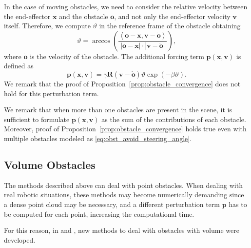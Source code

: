 \documentclass[fleqn, 11pt]{article}
\theoremstyle{definition}
\theoremstyle{plain}
\theoremstyle{remark}
\begin{document}
In the case of moving obstacles, we need to consider the relative velocity between the end-effector $\mathbf{x}$ and the obstacle $\mathbf{o}$, and not only the end-effector velocity $\mathbf{v}$ itself.
Therefore, we compute $\vartheta$ in the reference frame of the obstacle obtaining
\[ \vartheta = \arccos \left( { \frac{ \left\langle {\mathbf{o} - \mathbf{x}} , {\mathbf{v} - \dot{\mathbf{o}}} \right\rangle  }{|{\mathbf{o} - \mathbf{x}}| \cdot |{ \mathbf{v} - \dot{\mathbf{o}} } | } }  \right) , \]
where $\dot{\mathbf{o}}$ is the velocity of the obstacle.
The additional forcing term $\mathbf{p}(\mathbf{x},\mathbf{v})$ is defined as
\[ \mathbf{p}(\mathbf{x},\mathbf{v}) = \gamma \mathbf{R} ( \mathbf{v} - \dot{\mathbf{o}}) \vartheta \exp (-\beta \vartheta). \]
We remark that the proof of Proposition~\ref{prop:obstacle_convergence} does not hold for this perturbation term.

We remark that when more than one obstacles are present in the scene, it is sufficient to formulate $ \mathbf{p} (\mathbf{x}, \mathbf{v}) $ as the sum of the contributions of each obstacle.
Moreover, proof of Proposition~\ref{prop:obstacle_convergence} holds true even with multiple obstacles modeled as \eqref{eq:obst_avoid_steering_angle}.

\subsection{Volume Obstacles}

The methods described above can deal with point obstacles.
When dealing with real robotic situations, these methods may become numerically demanding since a dense point cloud may be necessary, and a different perturbation term $ \mathbf{p} $ has to be computed for each point, increasing the computational time.

For this reason, in \cite{GMCDSF19} and \cite{GMRSF20}, new methods to deal with obstacles with volume were developed.
\end{document}
